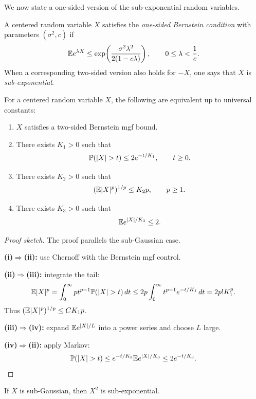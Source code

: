 We now state a one-sided version of the sub-exponential random variables.

\begin{de}
A centered random variable $X$ satisfies the \emph{one-sided Bernstein condition} with parameters $(\sigma^2,c)$ if
\[
\mathbb{E} e^{\lambda X}
\le
\exp\!\left(\frac{\sigma^2\lambda^2}{2(1-c\lambda)}\right),
\qquad 0\le \lambda < \frac1c.
\]
When a corresponding two-sided version also holds for $-X$, one says that $X$ is \emph{sub-exponential}.
\end{de}

\begin{prop}
For a centered random variable $X$, the following are equivalent up to universal constants:
\begin{enumerate}[label=(\roman*)]
    \item $X$ satisfies a two-sided Bernstein mgf bound.
    \item There exists $K_1>0$ such that
    \[
    \pr(|X|>t)\le 2e^{-t/K_1},
    \qquad t\ge 0.
    \]
    \item There exists $K_2>0$ such that
    \[
    (\mathbb{E} |X|^p)^{1/p}\le K_2 p,
    \qquad p\ge 1.
    \]
    \item There exists $K_3>0$ such that
    \[
    \mathbb{E} e^{|X|/K_3}\le 2.
    \]
\end{enumerate}
\end{prop}

\begin{proof}[Proof sketch]
The proof parallels the sub-Gaussian case.

\textbf{(i)$\Rightarrow$(ii):} use Chernoff with the Bernstein mgf control.

\textbf{(ii)$\Rightarrow$(iii):} integrate the tail:
\[
\E |X|^p
=
\int_0^\infty p t^{p-1}\pr(|X|>t)\,dt
\le
2p\int_0^\infty t^{p-1}e^{-t/K_1}\,dt
=
2p! K_1^p.
\]
Thus $(\mathbb{E} |X|^p)^{1/p}\le C K_1 p$.

\textbf{(iii)$\Rightarrow$(iv):} expand $\mathbb{E} e^{|X|/L}$ into a power series and choose $L$ large.

\textbf{(iv)$\Rightarrow$(ii):} apply Markov:
\[
\pr(|X|>t)\le e^{-t/K_3}\E e^{|X|/K_3}\le 2e^{-t/K_3}.
\]
\end{proof}

\begin{cor}
If $X$ is sub-Gaussian, then $X^2$ is sub-exponential.
\end{cor}

